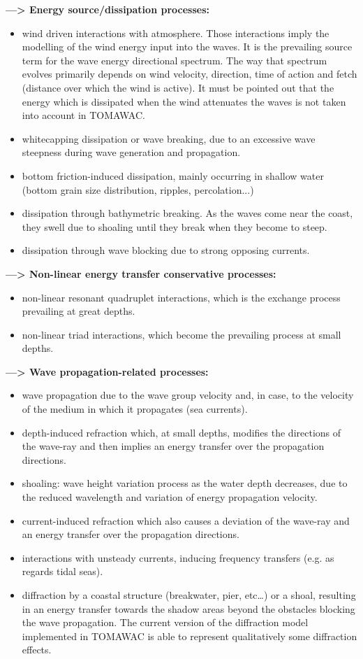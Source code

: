 {\bf—> Energy source/dissipation processes:}
\begin{itemize}
\item wind driven interactions with atmosphere. Those interactions imply the modelling of the wind energy input into the waves. It is the prevailing source term for the wave energy directional spectrum. The way that spectrum evolves primarily depends on wind velocity, direction, time of action and fetch (distance over which the wind is active). It must be pointed out that the energy which is dissipated when the wind attenuates the waves is not taken into account in TOMAWAC.
\item 	whitecapping dissipation or wave breaking, due to an excessive wave steepness during wave generation and propagation.
\item 	bottom friction-induced dissipation, mainly occurring in shallow water (bottom grain size distribution, ripples, percolation...)
\item 	dissipation through bathymetric breaking. As the waves come near the coast, they swell due to shoaling until they break when they become to steep.
\item dissipation through wave blocking due to strong opposing currents.
\end{itemize}
{\bf—> Non-linear energy transfer conservative processes:}
\begin{itemize}
\item 	non-linear resonant quadruplet interactions, which is the exchange process prevailing at great depths.
\item 		non-linear triad interactions, which become the prevailing process at small depths.
\end{itemize}
{\bf—> Wave propagation-related processes:}
\begin{itemize}
\item 	 wave propagation due to the wave group velocity and, in case, to the velocity of the medium in which it propagates (sea currents).
\item 	depth-induced refraction which, at small depths, modifies the directions of the wave-ray and then implies an energy transfer over the propagation directions.
\item 	shoaling: wave height variation process as the water depth decreases, due to the reduced wavelength and variation of energy propagation velocity.
\item 	current-induced refraction which also causes a deviation of the wave-ray and an energy transfer over the propagation directions.
\item 	interactions with unsteady currents, inducing frequency transfers (e.g. as regards tidal seas).
\item 	diffraction by a coastal structure (breakwater, pier, etc…) or a shoal, resulting in an energy transfer towards the shadow areas beyond the obstacles blocking the wave propagation. The current version of the diffraction model implemented in TOMAWAC is able to represent qualitatively some diffraction effects.
\end{itemize}

